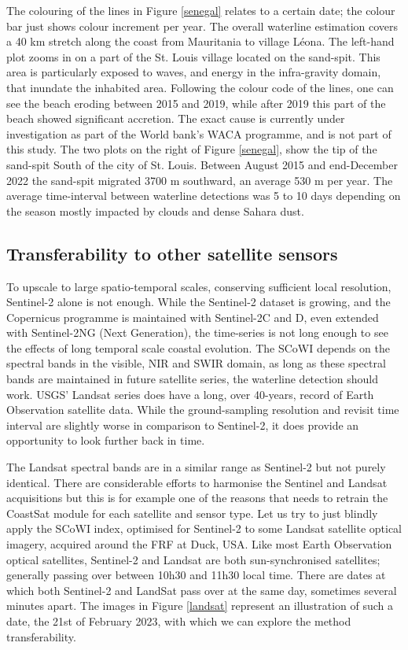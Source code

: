 \documentclass[remotesensing,technicalnote,submit,pdftex,moreauthors]{Definitions/mdpi}
\begin{document}
The colouring of the lines in Figure \ref{senegal} relates to a certain date; the colour bar just shows colour increment per year. The overall waterline estimation covers a 40 km stretch along the coast from Mauritania to village L\'{e}ona. The left-hand plot zooms in on a part of the St. Louis village located on the sand-spit. This area is particularly exposed to waves, and energy in the infra-gravity domain, that inundate the inhabited area. Following the colour code of the lines, one can see the beach eroding between 2015 and 2019, while after 2019 this part of the beach showed significant accretion. The exact cause is currently under investigation as part of the World bank's WACA programme, and is not part of this study. The two plots on the right of Figure \ref{senegal}, show the tip of the sand-spit South of the city of St. Louis. Between August 2015 and end-December 2022 the sand-spit migrated 3700 m southward, an average 530 m per year. The average time-interval between waterline detections was 5 to 10 days depending on the season mostly impacted by clouds and dense Sahara dust.
 
\subsection{Transferability to other satellite sensors}

  
To upscale to large spatio-temporal scales, conserving sufficient local resolution, Sentinel-2 alone is not enough. While the Sentinel-2 dataset is growing, and the Copernicus programme is maintained with Sentinel-2C and D, even extended with Sentinel-2NG (Next Generation), the time-series is not long enough to see the effects of long temporal scale coastal evolution. The SCoWI depends on the spectral bands in the visible, NIR and SWIR domain, as long as these spectral bands are maintained in future satellite series, the waterline detection should work. USGS' Landsat series does have a long, over 40-years, record of Earth Observation satellite data. While the ground-sampling resolution and revisit time interval are slightly worse in comparison to Sentinel-2, it does provide an opportunity to look further back in time. 

The Landsat spectral bands are in a similar range as Sentinel-2 but not purely identical. There are considerable efforts to harmonise the Sentinel and Landsat acquisitions but this is for example one of the reasons that \citet{VOS2019_google} needs to retrain the CoastSat module for each satellite and sensor type. Let us try to just blindly apply the SCoWI index, optimised for Sentinel-2 to some Landsat satellite optical imagery, acquired around the FRF at Duck, USA. Like most Earth Observation optical satellites, Sentinel-2 and Landsat are both sun-synchronised satellites; generally passing over between 10h30 and 11h30 local time. There are dates at which both Sentinel-2 and LandSat pass over at the same day, sometimes several minutes apart. The images in Figure \ref{landsat} represent an illustration of such a date, the 21st of February 2023, with which we can explore the method transferability.
\end{document}
